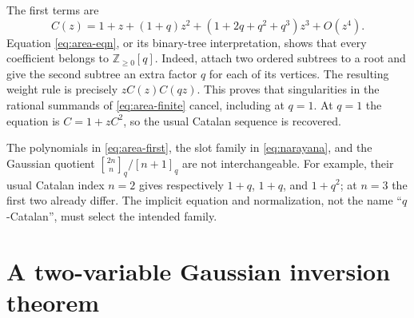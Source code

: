 \documentclass[11pt,a4paper]{article}
\numberwithin{equation}{section}
\theoremstyle{definition}
\theoremstyle{remark}
\newcommand{\Z}{\mathbb Z}
\newcommand{\qb}[2]{\genfrac{[}{]}{0pt}{}{#1}{#2}_{q}}
\newcommand{\qi}[1]{[#1]_{q}}
\begin{document}
The first terms are
\begin{equation}\label{eq:area-first}
 C(z)=1+z+(1+q)z^2+(1+2q+q^2+q^3)z^3+O(z^4).
\end{equation}
Equation \eqref{eq:area-eqn}, or its binary-tree interpretation, shows that every
coefficient belongs to $\Z_{\ge0}[q]$. Indeed, attach two ordered subtrees to a root
and give the second subtree an extra factor $q$ for each of its vertices. The
resulting weight rule is precisely $zC(z)C(qz)$. This proves that singularities
in the rational summands of \eqref{eq:area-finite} cancel, including at $q=1$.
At $q=1$ the equation is $C=1+zC^2$, so the usual Catalan sequence is recovered.

The polynomials in \eqref{eq:area-first}, the slot family in \eqref{eq:narayana},
and the Gaussian quotient $\qb{2n}n/\qi{n+1}$ are not interchangeable.
For example, their usual Catalan index $n=2$ gives respectively $1+q$,
$1+q$, and $1+q^2$; at $n=3$ the first two already differ. The implicit equation
and normalization, not the name ``$q$-Catalan'', must select the intended family.

\section{A two-variable Gaussian inversion theorem}\label{sec:coupled}
\end{document}
